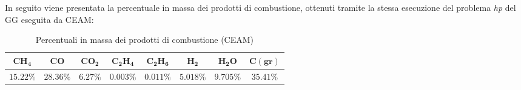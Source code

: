 In seguito viene presentata la percentuale in massa dei prodotti di combustione, ottenuti tramite la stessa esecuzione del problema \textit{hp} del GG eseguita da CEAM:

\begin{table}[H]

\centering
\begin{tabular}{|c|c|c|c|c|c|c|c|}
\hline
$\bm{CH_4}$ & $\bm{CO}$ & $\bm{CO_2}$ & $\bm{C_2H_4}$ & $\bm{C_2H_6}$ & $\bm{H_2}$ & $\bm{H_2O}$ & $\bm{C(gr)}$ \\
\hline
$15.22 \%$ & $28.36 \%$ & $6.27 \%$ & $0.003 \%$ & $0.011 \%$ & $5.018 \%$ & $9.705 \%$ & $35.41 \%$ \\
\hline
\end{tabular}

\caption{Percentuali in massa dei prodotti di combustione (CEAM)}
\label{table:output_CEAM_percentage}

\end{table}